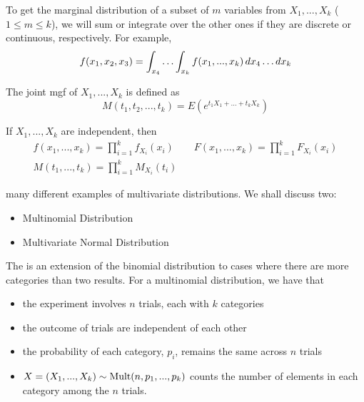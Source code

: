 \documentclass[notoc,notitlepage]{tufte-book}
\begin{document}
\begin{defn}
\label{defn:k_variate_marginal_distribution}
  To get the marginal distribution of a subset of $m$ variables from $X_1, ..., X_k$ ($1 \leq m \leq k$), we will sum or integrate over the other ones if they are discrete or continuous, respectively. For example,
  \begin{equation*}
    f(x_1, x_2, x_3) = \int_{x_4} \hdots \int_{x_k} f(x_1, ..., x_k) \mathop{}\!d{x_4} \hdots \mathop{}\!d{x_k}
  \end{equation*}
\end{defn}

\begin{defn}
\label{defn:k_variate_joint_mgf}
  The joint mgf of $X_1, ..., X_k$ is defined as
  \begin{equation*}
    M(t_1, t_2, ..., t_k) = E \left( e^{t_1 X_1 + \hdots + t_k X_k} \right)
  \end{equation*}
\end{defn}

\begin{propo}
\label{propo:independence_for_multivariate_cases}
  If $X_1, ..., X_k$ are independent, then
  \begin{gather*}
    f(x_1, ..., x_k) = \prod_{i=1}^{k} f_{X_i}(x_i) \qquad F(x_1, ..., x_k) = \prod_{i=1}^{k} F_{X_i}(x_i) \\
    M(t_1, ..., t_k) = \prod_{i=1}^{k} M_{X_i}(t_i)
  \end{gather*}
\end{propo}

 many different examples of multivariate distributions. We shall discuss two:
\begin{itemize}
  \item Multinomial Distribution
  \item Multivariate Normal Distribution
\end{itemize}

The  is an extension of the binomial distribution to cases where there are more categories than two results. For a multinomial distribution, we have that
\begin{itemize}
  \item the experiment involves $n$ trials, each with $k$ categories
  \item the outcome of trials are independent of each other
  \item the probability of each category, $p_i$, remains the same across $n$ trials
  \item $X = (X_1, ..., X_k) \sim \operatorname{Mult}(n, p_1, ..., p_k)$ counts the number of elements in each category among the $n$ trials.
\end{itemize}
\end{document}
